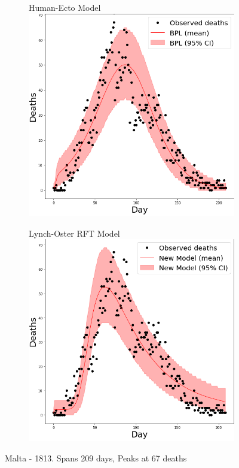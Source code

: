 \documentclass [letterpaper, 12pt] {article}
\begin{document}
\begin{figure}[H]
\begin{subfigure}{0.5\textwidth}
	\end{subfigure}
	\begin{subfigure}{0.5\textwidth}
		\centering
		Human-Ecto Model
		\includegraphics[width=\linewidth]{h_ecto/malta}
	\end{subfigure}\hspace{\fill}
	\begin{subfigure}{0.5\textwidth}
		\centering
		Lynch-Oster RFT Model
		\includegraphics[width=\linewidth]{rats2/malta}
	\end{subfigure}
	\caption{Malta - 1813. Spans 209 days, Peaks at 67 deaths}
\end{figure}
\end{document}
